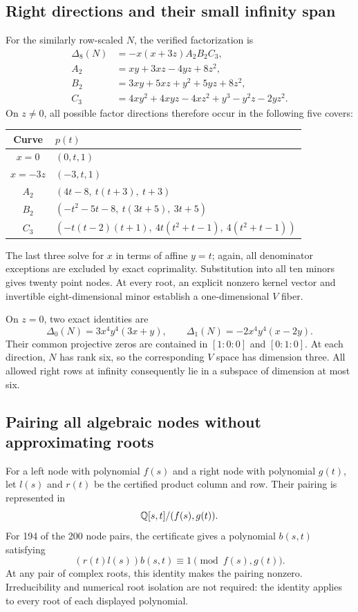 \documentclass[11pt]{article}
\theoremstyle{definition}\newtheorem{definition}[theorem]{Definition}
\begin{document}
\subsection{Right directions and their small infinity span}
For the similarly row-scaled $N$, the verified factorization is
\begin{align}\label{eq:Arightfactor}
\Delta_8(N)&=-x(x+3z)A_2B_2C_3,\\
A_2&=xy+3xz-4yz+8z^2,\nonumber\\
B_2&=3xy+5xz+y^2+5yz+8z^2,\nonumber\\
C_3&=4xy^2+4xyz-4xz^2+y^3-y^2z-2yz^2.\nonumber
\end{align}
On $z\ne0$, all possible factor directions therefore occur in the following five covers:
\begin{center}\small
\begin{tabular}{@{}cl@{}}\toprule
Curve & $p(t)$ \\\midrule
$x=0$ & $(0,t,1)$\\
$x=-3z$ & $(-3,t,1)$\\
$A_2$ & $(4t-8,\ t(t+3),\ t+3)$\\
$B_2$ & $(-t^2-5t-8,\ t(3t+5),\ 3t+5)$\\
$C_3$ & $(-t(t-2)(t+1),\ 4t(t^2+t-1),\ 4(t^2+t-1))$\\\bottomrule
\end{tabular}\end{center}
The last three solve for $x$ in terms of affine $y=t$; again, all denominator exceptions are excluded by exact coprimality. Substitution into all ten minors gives twenty point nodes. At every root, an explicit nonzero kernel vector and invertible eight-dimensional minor establish a one-dimensional $V$ fiber.

On $z=0$, two exact identities are
\[
\Delta_0(N)=3x^4y^4(3x+y),\qquad
\Delta_1(N)=-2x^4y^4(x-2y).
\]
Their common projective zeros are contained in $[1:0:0]$ and $[0:1:0]$. At each direction, $N$ has rank six, so the corresponding $V$ space has dimension three. All allowed right rows at infinity consequently lie in a subspace of dimension at most six.

\subsection{Pairing all algebraic nodes without approximating roots}
For a left node with polynomial $f(s)$ and a right node with polynomial $g(t)$, let $l(s)$ and $r(t)$ be the certified product column and row. Their pairing is represented in
\[
\mathbb Q[s,t]/(f(s),g(t)).
\]
For 194 of the 200 node pairs, the certificate gives a polynomial $b(s,t)$ satisfying
\begin{equation}\label{eq:unit}
(r(t)l(s))b(s,t)\equiv1\pmod{f(s),g(t)}.
\end{equation}
At any pair of complex roots, this identity makes the pairing nonzero. Irreducibility and numerical root isolation are not required: the identity applies to every root of each displayed polynomial.
\end{document}
